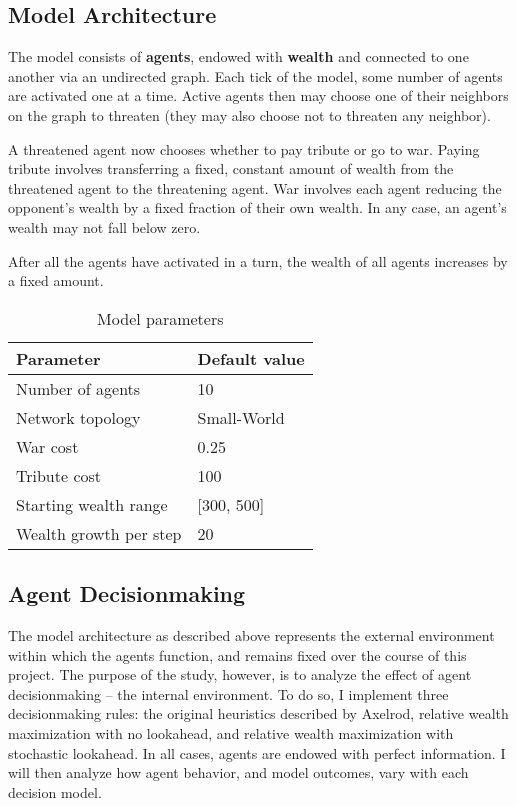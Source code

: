 \documentclass{article}
\begin{document}
\subsection{Model Architecture}

The model consists of \textbf{agents}, endowed with \textbf{wealth} and connected to one another via an undirected graph. Each tick of the model, some number of agents are activated one at a time. Active agents then may choose one of their neighbors on the graph to threaten (they may also choose not to threaten any neighbor). 

A threatened agent now chooses whether to pay tribute or go to war. Paying tribute involves transferring a fixed, constant amount of wealth from the threatened agent to the threatening agent. War involves each agent reducing the opponent's wealth by a fixed fraction of their own wealth. In any case, an agent's wealth may not fall below zero.

After all the agents have activated in a turn, the wealth of all agents increases by a fixed amount.

\begin{table}[h]
\begin{tabular}{@{}ll@{}}
\toprule
\textbf{Parameter}               & \textbf{Default value}                            \\ \midrule
Number of agents       & 10                                       \\
Network topology       & Small-World                              \\
War cost               & 0.25                                     \\
Tribute cost           & 100                                      \\
Starting wealth range        &  {[}300, 500{]} \\
Wealth growth per step & 20                                      \\ \bottomrule
\end{tabular}
\caption{Model parameters}
\end{table}

\subsection{Agent Decisionmaking}
The model architecture as described above represents the external environment within which the agents function, and remains fixed over the course of this project. The purpose of the study, however, is to analyze the effect of agent decisionmaking -- the internal environment. To do so, I implement three decisionmaking rules: the original heuristics described by Axelrod, relative wealth maximization with no lookahead, and relative wealth maximization with stochastic lookahead. In all cases, agents are endowed with perfect information.  I will then analyze how agent behavior, and model outcomes, vary with each decision model.
\end{document}

